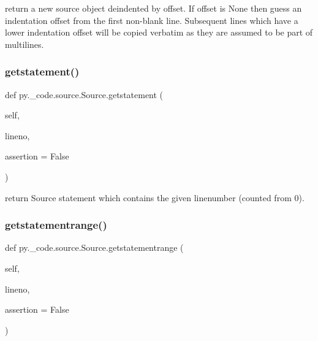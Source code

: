 \begin{DoxyVerb}return a new source object deindented by offset.
    If offset is None then guess an indentation offset from
    the first non-blank line.  Subsequent lines which have a
    lower indentation offset will be copied verbatim as
    they are assumed to be part of multilines.
\end{DoxyVerb}
 \mbox{\label{classpy_1_1__code_1_1source_1_1_source_aa21e0a21d02287db4a00be9f35a8fd40}} 
\subsubsection{\texorpdfstring{getstatement()}{getstatement()}}
{\footnotesize\ttfamily def py.\+\_\+code.\+source.\+Source.\+getstatement (\begin{DoxyParamCaption}\item[{}]{self,  }\item[{}]{lineno,  }\item[{}]{assertion = {\ttfamily False} }\end{DoxyParamCaption})}

\begin{DoxyVerb}return Source statement which contains the
    given linenumber (counted from 0).
\end{DoxyVerb}
 \mbox{\label{classpy_1_1__code_1_1source_1_1_source_a957302d50eeb4bda3d0a231e95b92066}} 
\subsubsection{\texorpdfstring{getstatementrange()}{getstatementrange()}}
{\footnotesize\ttfamily def py.\+\_\+code.\+source.\+Source.\+getstatementrange (\begin{DoxyParamCaption}\item[{}]{self,  }\item[{}]{lineno,  }\item[{}]{assertion = {\ttfamily False} }\end{DoxyParamCaption})}


